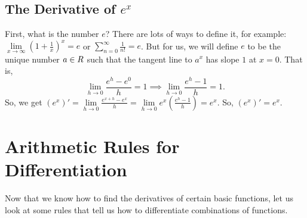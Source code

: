 \subsection{The Derivative of \texorpdfstring{$ e^x $}{ex}}
First, what is the number $ e $? There are lots of ways to define it, for example:
$ \lim\limits_{{x} \to {\infty}}(1+\frac{1}{x})^{x}=e $ or $ \sum_{n=0}^{\infty}\frac{1}{n!}=e $.
But for us, we will define $ e $ to be the unique number $ a\in\relax{R} $ such that the tangent line to $ a^x $
has slope $ 1 $ at $ x=0 $. That is,
\[ \lim\limits_{{h} \to {0}}\frac{e^h-e^0}{h}=1\implies \lim\limits_{{h} \to {0}}\frac{e^h-1}{h}=1. \]
So, we get $ (e^x)'=\lim\limits_{{h} \to {0}}\frac{e^{x+h}-e^x}{h}=\lim\limits_{{h} \to {0}}e^x(\frac{e^h-1}{h})=e^x $.
So, $ (e^x)'=e^x $.

\setcounter{section}{6}
\section{Arithmetic Rules for Differentiation}
Now that we know how to find the derivatives of certain basic functions,
let us look at some rules that tell us how to differentiate combinations
of functions.
